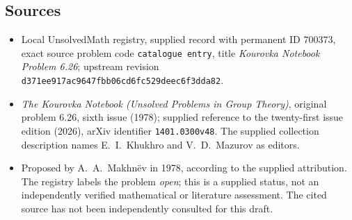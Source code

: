 \documentclass[11pt]{article}
\begin{document}
\subsection{Sources}
\begin{itemize}
\item Local UnsolvedMath registry, supplied record with permanent ID \(700373\), exact source problem code \texttt{catalogue entry}, title \emph{Kourovka Notebook Problem 6.26}; upstream revision \texttt{d371ee917ac9647fbb06cd6fc529deec6f3dda82}.
\item \emph{The Kourovka Notebook (Unsolved Problems in Group Theory)}, original problem 6.26, sixth issue (1978); supplied reference to the twenty-first issue edition (2026), arXiv identifier \texttt{1401.0300v48}. The supplied collection description names E.\ I.\ Khukhro and V.\ D.\ Mazurov as editors.
\item Proposed by A.\ A.\ Makhn\"ev in 1978, according to the supplied attribution. The registry labels the problem \emph{open}; this is a supplied status, not an independently verified mathematical or literature assessment. The cited source has not been independently consulted for this draft.
\end{itemize}
\end{document}
